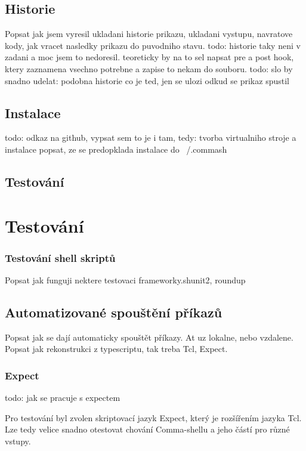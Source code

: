 \documentclass[thesis=M,czech]{FITthesis}[2012/06/26]
\begin{document}
\section{Historie}
Popsat jak jsem vyresil ukladani historie prikazu, ukladani vystupu, navratove kody, jak vracet nasledky prikazu do puvodniho stavu.
todo: historie taky neni v zadani a moc jsem to nedoresil. teoreticky by na to sel napsat pre a post hook, ktery zaznamena vsechno potrebne a zapise to nekam do souboru.
todo: slo by snadno udelat: podobna historie co je ted, jen se ulozi odkud se prikaz spustil


\section{Instalace}
todo: odkaz na github, vypsat sem to je i tam, tedy: tvorba virtualniho stroje a instalace
popsat, ze se predopklada instalace do ~/.commash

\section{Testování}


%
%
\chapter{Testování}


\subsection{Testování shell skriptů}
Popsat jak funguji nektere testovaci frameworky.shunit2, roundup


\section{Automatizované spouštění příkazů}
Popsat jak se dají automaticky spouštět příkazy. At uz lokalne, nebo vzdalene. Popsat jak rekonstrukci z typescriptu, tak treba Tcl, Expect.

\subsection{Expect}
todo: jak se pracuje s expectem

Pro testování byl zvolen skriptovací jazyk Expect, který je rozšířením jazyka Tcl. Lze tedy velice snadno otestovat chování Comma-shellu a jeho částí pro různé vstupy.
\end{document}
